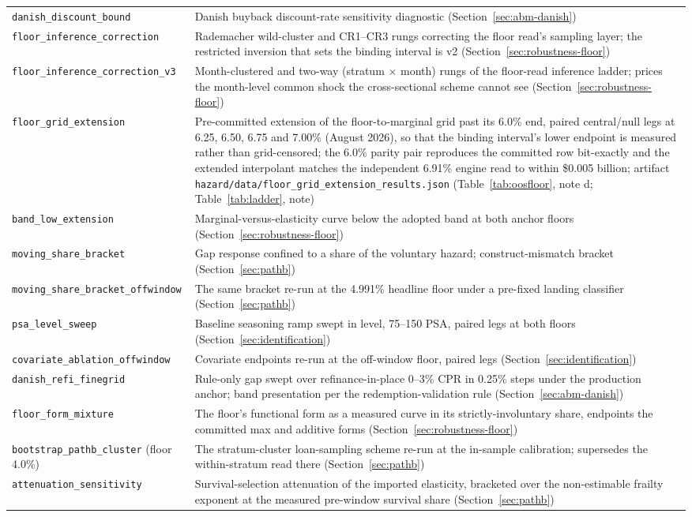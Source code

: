 \documentclass[12pt]{article}
\begin{document}
{\begin{longtable}{@{}p{5.4cm}p{8.8cm}@{}}
\texttt{danish\_discount\_bound} & Danish buyback discount-rate sensitivity diagnostic (Section~\ref{sec:abm-danish}) \\
\texttt{floor\_inference\_correction} & Rademacher wild-cluster and CR1--CR3 rungs correcting the floor read's sampling layer; the restricted inversion that sets the binding interval is v2 (Section~\ref{sec:robustness-floor}) \\
\texttt{floor\_inference\_correction\_v3} & Month-clustered and two-way (stratum $\times$ month) rungs of the floor-read inference ladder; prices the month-level common shock the cross-sectional scheme cannot see (Section~\ref{sec:robustness-floor}) \\
\texttt{floor\_grid\_extension} & Pre-committed extension of the floor-to-marginal grid past its 6.0\% end, paired central/null legs at 6.25, 6.50, 6.75 and 7.00\% (August 2026), so that the binding interval's lower endpoint is measured rather than grid-censored; the 6.0\% parity pair reproduces the committed row bit-exactly and the extended interpolant matches the independent 6.91\% engine read to within \$0.005 billion; artifact \texttt{hazard/data/floor\_grid\_extension\_results.json} (Table~\ref{tab:oosfloor}, note d; Table~\ref{tab:ladder}, note) \\
\texttt{band\_low\_extension} & Marginal-versus-elasticity curve below the adopted band at both anchor floors (Section~\ref{sec:robustness-floor}) \\
\texttt{moving\_share\_bracket} & Gap response confined to a share of the voluntary hazard; construct-mismatch bracket (Section~\ref{sec:pathb}) \\ \texttt{moving\_share\_bracket\_offwindow} & The same bracket re-run at the 4.991\% headline floor under a pre-fixed landing classifier (Section~\ref{sec:pathb}) \\ \texttt{psa\_level\_sweep} & Baseline seasoning ramp swept in level, 75--150 PSA, paired legs at both floors (Section~\ref{sec:identification}) \\ \texttt{covariate\_ablation\_offwindow} & Covariate endpoints re-run at the off-window floor, paired legs (Section~\ref{sec:identification}) \\ \texttt{danish\_refi\_finegrid} & Rule-only gap swept over refinance-in-place 0--3\% CPR in 0.25\% steps under the production anchor; band presentation per the redemption-validation rule (Section~\ref{sec:abm-danish}) \\ \texttt{floor\_form\_mixture} & The floor's functional form as a measured curve in its strictly-involuntary share, endpoints the committed max and additive forms (Section~\ref{sec:robustness-floor}) \\ \texttt{bootstrap\_pathb\_cluster} (floor 4.0\%) & The stratum-cluster loan-sampling scheme re-run at the in-sample calibration; supersedes the within-stratum read there (Section~\ref{sec:pathb}) \\ \texttt{attenuation\_sensitivity} & Survival-selection attenuation of the imported elasticity, bracketed over the non-estimable frailty exponent at the measured pre-window survival share (Section~\ref{sec:pathb}) \\

\end{longtable}}
\end{document}
